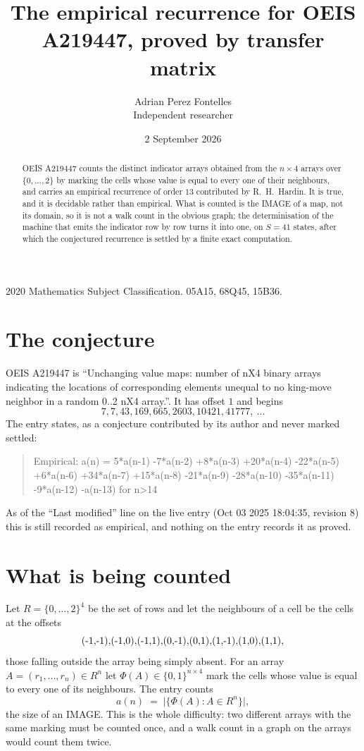 \documentclass[11pt,a4paper]{article}
\title{The empirical recurrence for OEIS A219447, proved by transfer matrix}
\author{Adrian Perez Fontelles\\ \small Independent researcher}
\date{2 September 2026}
\theoremstyle{plain}
\theoremstyle{definition}
\begin{document}
\maketitle

\begin{abstract}
OEIS A219447 counts the distinct indicator arrays obtained from the $n\times4$ arrays over
$\{0,\dots,2\}$ by marking the cells whose value is equal to every one of their neighbours, and carries an
empirical recurrence of order $13$ contributed by R.~H.~Hardin. It is true, and it is
decidable rather than empirical. What is counted is the IMAGE of a map, not its domain, so it
is not a walk count in the obvious graph; the determinisation of the machine that emits the
indicator row by row turns it into one, on $S=41$ states, after which the conjectured
recurrence is settled by a finite exact computation.
\end{abstract}

\noindent\small 2020 Mathematics Subject Classification. 05A15, 68Q45, 15B36.\normalsize

\section{The conjecture}

OEIS A219447 is ``Unchanging value maps: number of nX4 binary arrays indicating the locations of corresponding elements unequal to no king-move neighbor in a random 0..2 nX4 array.''. It has offset $1$ and begins
\[
7, 7, 43, 169, 665, 2603, 10421, 41777,\ \dots
\]
The entry states, as a conjecture contributed by its author and never marked settled:
\begin{quote}
Empirical: a(n) = 5*a(n-1) -7*a(n-2) +8*a(n-3) +20*a(n-4) -22*a(n-5) +6*a(n-6) +34*a(n-7) +15*a(n-8) -21*a(n-9) -28*a(n-10) -35*a(n-11) -9*a(n-12) -a(n-13) for n>14
\end{quote}
As of the ``Last modified'' line on the live entry (Oct 03 2025 18:04:35, revision 8) this is still
recorded as empirical, and nothing on the entry records it as proved.

\section{What is being counted}

Let $R=\{0,\dots,2\}^{4}$ be the set of rows and let the neighbours of a cell be the
cells at the offsets
\[
$(-1,-1)$, $(-1,0)$, $(-1,1)$, $(0,-1)$, $(0,1)$, $(1,-1)$, $(1,0)$, $(1,1)$,
\]
those falling outside the array being simply absent. For an array
$A=(r_1,\dots,r_n)\in R^n$ let $\Phi(A)\in\{0,1\}^{n\times4}$ mark the cells whose value
is equal to every one of its neighbours. The entry counts
\[
a(n)\;=\;\bigl|\{\Phi(A):A\in R^n\}\bigr| ,
\]
the size of an IMAGE. This is the whole difficulty: two different arrays with the same marking
must be counted once, and a walk count in a graph on the arrays would count them twice.
\end{document}
